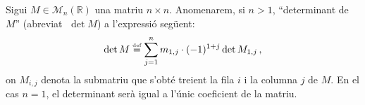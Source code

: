 
\newcommand{\bl}{\color{blue}}
\newcommand{\rd}{\color{red}}
\newcommand{\gre}{\color{ForestGreen}}

\newcommand{\ucarr}{\mathbin{\text{\rotatebox[origin=c]{270}{$\curvearrowleft$}}}}
\newcommand{\dcarr}{\mathbin{\text{\rotatebox[origin=c]{270}{$\curvearrowright$}}}}

\begin{defi*}[Determinant]
	Sigui $M \in \mathcal{M}_n(\mathbb{R})$ una matriu $n\times n$. Anomenarem, si $n>1$, ``determinant de $M$'' (abreviat $\; \det M$) a l'expressió següent: \[\det M \stackrel{\text{\tiny def}}{=} \sum_{j=1}^{n} m_{1,j}\cdot(-1)^{1+j}\det M_{1,j}  \,,\] on $M_{i,j}$ denota la submatriu que s'obté treient la fila $i$ i la columna $j$ de $M$. En el cas $n=1$, el determinant serà igual a l'únic coeficient de la matriu.
\end{defi*}

\vspace{1cm}


